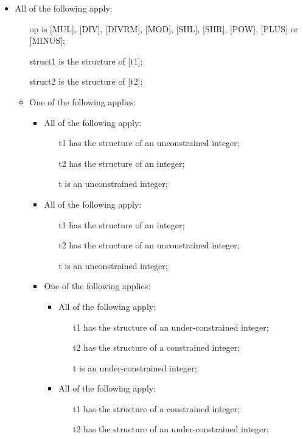 \documentclass{book}
\begin{document}
\begin{itemize}
  \item  All of the following apply:
    \begin{itemize}
    \item  [op] is [MUL], [DIV], [DIVRM], [MOD], [SHL], [SHR], [POW], [PLUS] or [MINUS];
    \item  [struct1] is the structure of [t1];
    \item  [struct2] is the structure of [t2];
    \item  One of the following applies:
      \begin{itemize}
      \item  All of the following apply:
        \begin{itemize}
        \item  [t1] has the structure of an unconstrained integer;
        \item  [t2] has the structure of an integer;
        \item  [t] is an unconstrained integer;
        \end{itemize}
      \item  All of the following apply:
        \begin{itemize}
        \item  [t1] has the structure of an integer;
        \item  [t2] has the structure of an unconstrained integer;
        \item  [t] is an unconstrained integer;
        \end{itemize}
      \item  One of the following applies:
       \begin{itemize} 
       \item  All of the following apply:
          \begin{itemize}
          \item  [t1] has the structure of an under-constrained integer;
          \item  [t2] has the structure of a constrained integer;
          \item  [t] is an under-constrained integer;
          \end{itemize}
        \item  All of the following apply:
          \begin{itemize}
          \item  [t1] has the structure of a constrained integer;
          \item  [t2] has the structure of an under-constrained integer;

\end{itemize}
\end{itemize}
\end{itemize}
\end{itemize}
\end{itemize}
\end{document}
